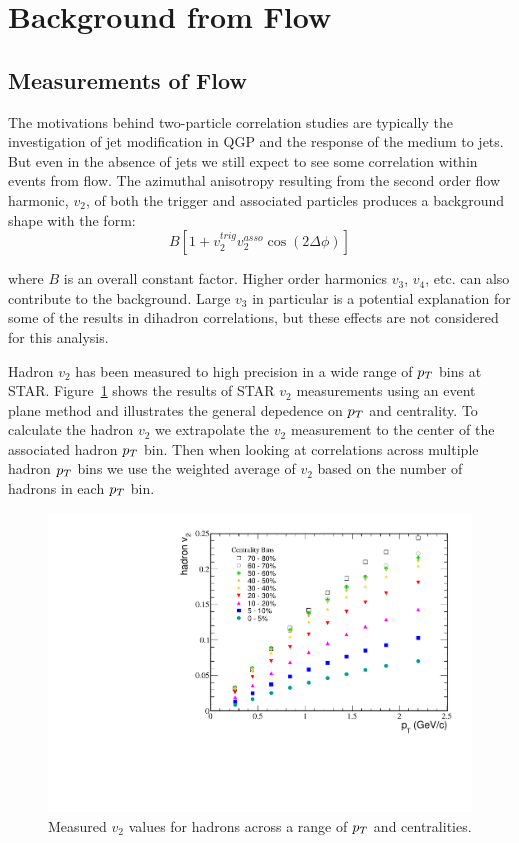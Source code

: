 \section{Background from Flow}

\subsection{Measurements of Flow}

The motivations behind two-particle correlation studies are typically the investigation of jet modification in QGP and the response of the medium to jets. But even in the absence of jets we still expect to see some correlation within events from flow. The azimuthal anisotropy resulting from the second order flow harmonic, $v_2$, of both the trigger and associated particles produces a background shape with the form:
\begin{equation}\label{eq:v2background}
 B[1 + v^{trig}_{2}v^{asso}_{2} \cos(2\Delta\phi)] 
\end{equation}

where $B$ is an overall constant factor. Higher order harmonics $v_3$, $v_4$, etc. can also contribute to the background. Large $v_3$ in particular is a potential explanation for some of the results in dihadron correlations, but these effects are not considered for this analysis. 

Hadron $v_2$ has been measured to high precision in a wide range of $p_{T}$ bins at STAR. Figure~\ref{fig:STARHadv2} shows the results of STAR $v_2$ measurements using an event plane method and illustrates the general depedence on $p_{T}$ and centrality. To calculate the hadron $v_2$ we extrapolate the $v_2$ measurement to the center of the associated hadron $p_{T}$ bin. Then when looking at correlations across multiple hadron $p_{T}$ bins we use the weighted average of $v_2$ based on the number of hadrons in each $p_{T}$ bin.

\begin{figure}[htbp]
\begin{center}
\includegraphics[scale=.8]{Plots/Correlations/STAR_hadron_v2.pdf}
\end{center}
\caption[STAR measured hadron $v_2$]{Measured $v_2$ values for hadrons across a range of $p_{T}$ and centralities.}
\label{fig:STARHadv2}
\end{figure}

